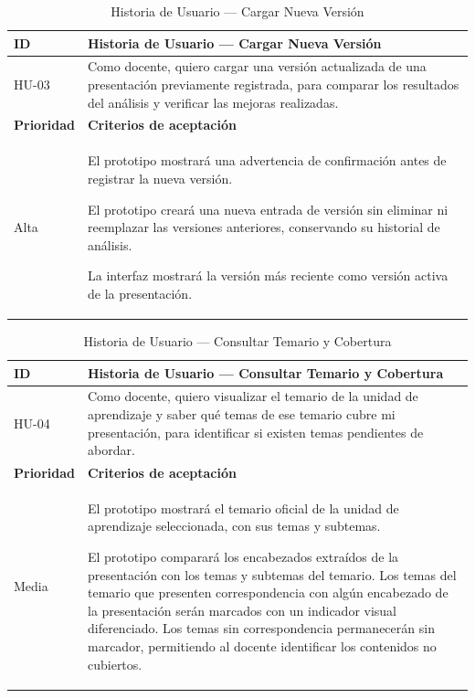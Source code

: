 \documentclass[11pt]{article}
\begin{document}
\begin{table}[H]
    \centering
    \renewcommand{\arraystretch}{1.2}
    \begin{tabular}{|p{2.5cm}|p{11cm}|}
        \hline
        \textbf{ID} & \textbf{Historia de Usuario --- Cargar Nueva Versión} \\
        \hline
        HU-03 & Como docente, quiero cargar una versión actualizada de una presentación previamente registrada, para comparar los resultados del análisis y verificar las mejoras realizadas. \\
        \hline
        \textbf{Prioridad} & \textbf{Criterios de aceptación} \\
        \hline
        Alta & El prototipo mostrará una advertencia de confirmación antes de registrar la nueva versión. 
        
        El prototipo creará una nueva entrada de versión sin eliminar ni reemplazar las versiones anteriores, conservando su historial de análisis. 
        
        La interfaz mostrará la versión más reciente como versión activa de la presentación. \\
        \hline
    \end{tabular}
    \caption{ Historia de Usuario — Cargar Nueva Versión}
    \label{tab:hu-cargar-nueva-version}
\end{table}


\begin{table}[H]
    \centering
    \renewcommand{\arraystretch}{1.2}
    \begin{tabular}{|p{2.5cm}|p{11cm}|}
        \hline
        \textbf{ID} & \textbf{Historia de Usuario --- Consultar Temario y Cobertura} \\
        \hline
        HU-04 & Como docente, quiero visualizar el temario de la unidad de aprendizaje y saber qué temas de ese temario cubre mi presentación, para identificar si existen temas pendientes de abordar. \\
        \hline
        \textbf{Prioridad} & \textbf{Criterios de aceptación} \\
        \hline
        Media & El prototipo mostrará el temario oficial de la unidad de aprendizaje seleccionada, con sus temas y subtemas. 
        
        El prototipo comparará los encabezados extraídos de la presentación con los temas y subtemas del temario. Los temas del temario que presenten correspondencia con algún encabezado de la presentación serán marcados con un indicador visual diferenciado. Los temas sin correspondencia permanecerán sin marcador, permitiendo al docente identificar los contenidos no cubiertos. \\
        \hline
    \end{tabular}
    \caption{Historia de Usuario — Consultar Temario y Cobertura}
    \label{tab:hu-consultar-temario-cobertura}
\end{table}
\end{document}
